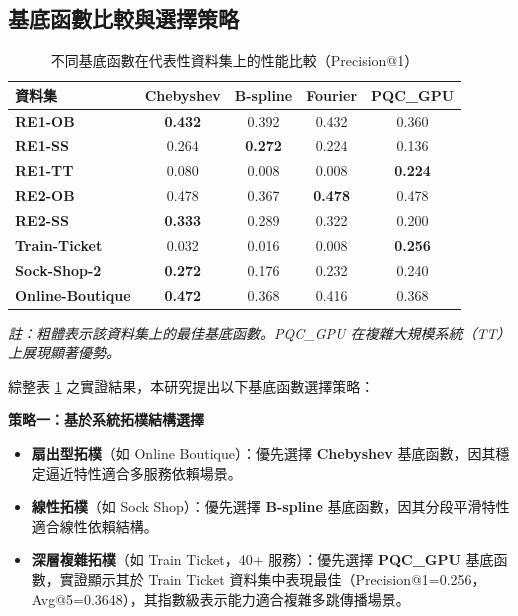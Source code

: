 \documentclass[10pt,a4paper,twocolumn]{article}
\begin{document}
\subsection{基底函數比較與選擇策略}

\begin{table}[htbp]
\centering
\caption{不同基底函數在代表性資料集上的性能比較（Precision@1）}
\label{tab:basis_comparison}
\footnotesize
\renewcommand{\arraystretch}{0.85}
\setlength{\tabcolsep}{2.5pt}
\begin{tabular}{l|cccc}
\toprule
\textbf{資料集} & \textbf{Chebyshev} & \textbf{B-spline} & \textbf{Fourier} & \textbf{PQC\_GPU} \\
\midrule
\textbf{RE1-OB} & \textbf{0.432} & 0.392 & 0.432 & 0.360 \\
\textbf{RE1-SS} & 0.264 & \textbf{0.272} & 0.224 & 0.136 \\
\textbf{RE1-TT} & 0.080 & 0.008 & 0.008 & \textbf{0.224} \\
\midrule
\textbf{RE2-OB} & 0.478 & 0.367 & \textbf{0.478} & 0.478 \\
\textbf{RE2-SS} & \textbf{0.333} & 0.289 & 0.322 & 0.200 \\
\midrule
\textbf{Train-Ticket} & 0.032 & 0.016 & 0.008 & \textbf{0.256} \\
\textbf{Sock-Shop-2} & \textbf{0.272} & 0.176 & 0.232 & 0.240 \\
\textbf{Online-Boutique} & \textbf{0.472} & 0.368 & 0.416 & 0.368 \\
\bottomrule
\end{tabular}
\vspace{0.2cm}

\footnotesize \textit{註：粗體表示該資料集上的最佳基底函數。PQC\_GPU 在複雜大規模系統（TT）上展現顯著優勢。}
\end{table}

綜整表 \ref{tab:basis_comparison} 之實證結果，本研究提出以下基底函數選擇策略：

\textbf{策略一：基於系統拓樸結構選擇}
\begin{itemize}
\item \textbf{扇出型拓樸}（如 Online Boutique）：優先選擇 \textbf{Chebyshev} 基底函數，因其穩定逼近特性適合多服務依賴場景。
\item \textbf{線性拓樸}（如 Sock Shop）：優先選擇 \textbf{B-spline} 基底函數，因其分段平滑特性適合線性依賴結構。
\item \textbf{深層複雜拓樸}（如 Train Ticket，40+ 服務）：優先選擇 \textbf{PQC\_GPU} 基底函數，實證顯示其於 Train Ticket 資料集中表現最佳（Precision@1=0.256，Avg@5=0.3648），其指數級表示能力適合複雜多跳傳播場景。
\end{itemize}
\end{document}
